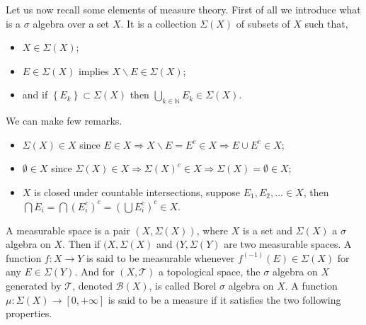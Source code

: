 \documentclass[10pt]{book}
\newcommand{\Mcal}{\mathcal{M}}
\newcommand{\Ncal}{\mathcal{N}}
\newcommand{\Tcal}{\mathcal{T}}
\theoremstyle{break}
\begin{document}
\bigskip


%
%
%
%
%
%
%
Let us now recall some elements of measure theory. First of all we introduce what is a $\sigma$ algebra over a set $X$. It is a collection $\Sigma(X)$ of subsets of $X$ such that,
%
\begin{itemize}
\item $X \in \Sigma(X)$; 
\item $E \in \Sigma(X)$ implies $X \backslash E \in \Sigma(X)$;
\item and if $\left\{ E_k \right\} \subset \Sigma(X)$ then $\underset{k \in \mathbb{N}}{\bigcup} E_k \in \Sigma(X)$.
\end{itemize}
%
We can make few remarks. 
%
\begin{itemize}
\item $\Sigma(X) \in X$ since $E \in X \Rightarrow X \backslash E = E^c \in X \Rightarrow E \cup E^c \in X$;
%
\item $\emptyset \in X$ since $\Sigma(X) \in X \Rightarrow \Sigma(X)^c \in X \Rightarrow \Sigma(X) = \emptyset \in X$;
%
\item $X$ is closed under countable intersections, suppose $E_1, E_2, ... \in X$, then $\bigcap E_i = \bigcap (E_i^c)^c = ( \bigcup E_i^c )^c \in X$.
\end{itemize}
%
A measurable space is a pair $(X, \Sigma(X))$, where $X$ is a set and $\Sigma(X)$ a $\sigma$ algebra on $X$.
%
Then if $(X,\Sigma(X)$ and $(Y,\Sigma(Y)$ are two measurable spaces. A function $f : X \to Y$ is said to be measurable whenever $f^{(-1)}(E) \in \Sigma(X)$ for any $E \in \Sigma(Y)$. 
%
And for $(X,\Tcal)$ a topological space, the $\sigma$ algebra on $X$ generated by $\Tcal$, denoted $\mathcal{B}(X)$, is called Borel $\sigma$ algebra on $X$.
%
A function $\mu : \Sigma(X) \to [0,+\infty]$ is said to be a measure if it satisfies the two following properties.
\end{document}
